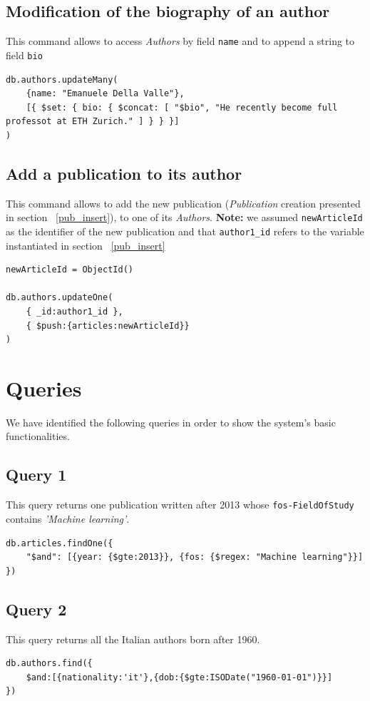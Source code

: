 \documentclass{Configuration_Files/PoliMi3i_thesis}
\begin{document}
\subsection{Modification of the biography of an author}
This command allows to access \emph{Authors} by field \verb |name| and to append a string to field \verb |bio|
\begin{lstlisting}
db.authors.updateMany(
	{name: "Emanuele Della Valle"},
	[{ $set: { bio: { $concat: [ "$bio", "He recently become full professot at ETH Zurich." ] } } }]
)
\end{lstlisting}

\subsection{Add a publication to its author}
This command allows to add the new publication (\emph{Publication} creation presented in section ~\ref{pub_insert}), to
one of its \emph{Authors}. \newline
\textbf{Note:} we assumed \verb |newArticleId| as the identifier of the new publication and that \verb |author1_id|
refers to the variable instantiated in section ~\ref{pub_insert}
\begin{lstlisting}
newArticleId = ObjectId()

db.authors.updateOne(
	{ _id:author1_id },
	{ $push:{articles:newArticleId}}
)
\end{lstlisting}


\section{Queries}
We have identified the following queries in order to show the system's basic functionalities.

\subsection{Query 1}
This query returns one publication written after 2013 whose \verb |fos-FieldOfStudy| contains \emph{'Machine learning'}.
\begin{lstlisting}
db.articles.findOne({
	"$and": [{year: {$gte:2013}}, {fos: {$regex: "Machine learning"}}]
})
\end{lstlisting}

\subsection{Query 2}
This query returns all the Italian authors born after 1960.
\begin{lstlisting}
db.authors.find({
	$and:[{nationality:'it'},{dob:{$gte:ISODate("1960-01-01")}}]
})
\end{lstlisting}
\end{document}
